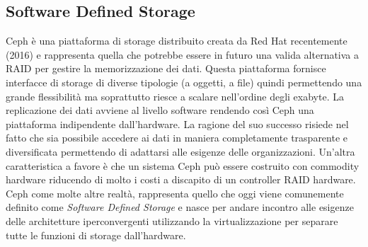 \subsection{Software Defined Storage}
Ceph è una piattaforma di storage distribuito creata da Red Hat recentemente (2016) e rappresenta quella che potrebbe essere in futuro una valida alternativa a RAID per gestire la memorizzazione dei dati. Questa piattaforma fornisce interfacce di storage di diverse tipologie (a oggetti, a file) quindi permettendo una grande flessibilità ma soprattutto riesce a scalare nell'ordine degli exabyte. La replicazione dei dati avviene al livello software rendendo così Ceph una piattaforma indipendente dall'hardware. La ragione del suo successo risiede nel fatto che sia possibile accedere ai dati in maniera completamente trasparente e diversificata permettendo di adattarsi alle esigenze delle organizzazioni. Un'altra caratteristica a favore è che un sistema Ceph può essere costruito con commodity hardware riducendo di molto i costi a discapito di un controller RAID hardware. Ceph come molte altre realtà, rappresenta quello che oggi viene comunemente definito come \textit{Software Defined Storage} e nasce per andare incontro alle esigenze delle architetture iperconvergenti utilizzando la virtualizzazione per separare tutte le funzioni di storage dall'hardware.
